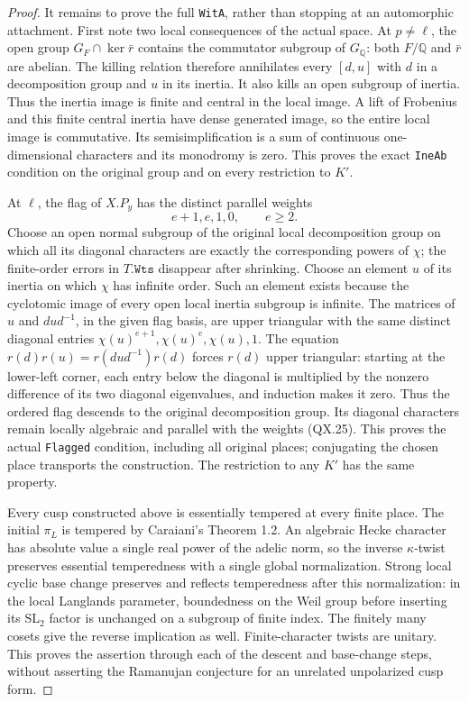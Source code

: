\begin{proof}
It remains to prove the full \texttt{WitA}, rather
than stopping at an automorphic attachment.
First note two local consequences of the actual
space.  At $p\ne\ell$, the open group
$G_F\cap\ker\bar r$ contains the commutator
subgroup of $G_{\mathbb Q}$: both $F/\mathbb Q$
and $\bar r$ are abelian.  The killing relation
therefore annihilates every $[d,u]$ with $d$ in
a decomposition group and $u$ in its inertia.
It also kills an open subgroup of inertia.
Thus the inertia image is finite and central
in the local image.  A lift of Frobenius and
this finite central inertia have dense generated
image, so the entire local image is commutative.
Its semisimplification is a sum of continuous
one-dimensional characters and its monodromy is
zero.  This proves the exact \texttt{IneAb}
condition on the original group and on every
restriction to $K'$.

At $\ell$, the flag of $X.P_y$ has the distinct
parallel weights
\[
                     e+1, e, 1, 0,\qquad e\ge2.
                     \tag{QX.25}
\]
Choose an open normal subgroup of the original
local decomposition group on which all its
diagonal characters are exactly the corresponding
powers of $\chi$; the finite-order errors in
$T.\texttt{Wts}$ disappear after shrinking.
Choose an element $u$ of its inertia on which
$\chi$ has infinite order.  Such an element
exists because the cyclotomic image of every
open local inertia subgroup is infinite.
The matrices of $u$ and $dud^{-1}$, in the
given flag basis, are upper triangular with
the same distinct diagonal entries
$\chi(u)^{e+1},\chi(u)^e,\chi(u),1$.
The equation
$r(d)r(u)=r(dud^{-1})r(d)$ forces $r(d)$
upper triangular: starting at the lower-left
corner, each entry below the diagonal is
multiplied by the nonzero difference of its
two diagonal eigenvalues, and induction makes
it zero.  Thus the ordered flag descends to
the original decomposition group.  Its diagonal
characters remain locally algebraic and parallel
with the weights (QX.25).  This proves the
actual \texttt{Flagged} condition, including
all original places; conjugating the chosen
place transports the construction.  The
restriction to any $K'$ has the same property.

Every cusp constructed above is essentially
tempered at every finite place.  The initial
$\pi_L$ is tempered by Caraiani's Theorem 1.2.
An algebraic Hecke character has absolute value
a single real power of the adelic norm, so the
inverse $\kappa$-twist preserves essential
temperedness with a single global normalization.
Strong local cyclic base change preserves and
reflects temperedness after this normalization:
in the local Langlands parameter, boundedness
on the Weil group before inserting its
$\mathrm{SL}_2$ factor is unchanged on a subgroup
of finite index.  The finitely many cosets give
the reverse implication as well.  Finite-character
twists are unitary.  This proves the assertion
through each of the descent and base-change
steps, without asserting the Ramanujan conjecture
for an unrelated unpolarized cusp form.


\end{proof}
